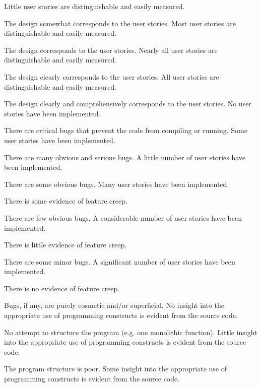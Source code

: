 \documentclass{../fal_assignment}
\begin{document}
\begin{markingrubric}
        \grade Little user stories are distinguishable and easily measured.
            \par The design somewhat corresponds to the user stories.
        \grade Most user stories are distinguishable and easily measured.
            \par The design corresponds to the user stories.
        \grade Nearly all user stories are distinguishable and easily measured.
            \par The design clearly corresponds to the user stories.
        \grade All user stories are distinguishable and easily measured.
            \par The design clearly and comprehensively corresponds to the user stories.
%
        \grade\fail No user stories have been implemented.
            \par There are critical bugs that prevent the code from compiling or running.
        \grade Some user stories have been implemented.
            \par There are many obvious and serious bugs.
        \grade A little number of user stories have been implemented.
            \par There are some obvious bugs.
        \grade Many user stories have been implemented.
            \par There is some evidence of feature creep.
            \par There are few obvious bugs.
        \grade A considerable number of user stories have been implemented.
            \par There is little evidence of feature creep.
            \par There are some minor bugs.
        \grade A significant number of user stories have been implemented.
            \par There is no evidence of feature creep.
            \par Bugs, if any, are purely cosmetic and/or superficial.
%
        \grade\fail No insight into the appropriate use of programming constructs is evident from the source code.
            \par No attempt to structure the program (e.g. one monolithic function).
        \grade Little insight into the appropriate use of programming constructs is evident from the source code.
            \par The program structure is poor.
        \grade Some insight into the appropriate use of programming constructs is evident from the source code.

\end{markingrubric}
\end{document}
